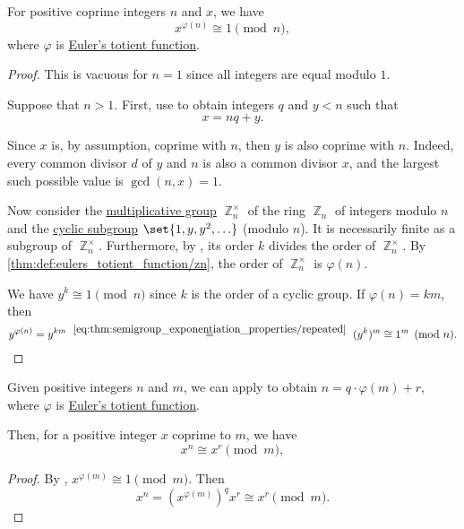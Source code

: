 \begin{theorem}\label{thm:eulers_totient_theorem}
  For positive coprime integers \( n \) and \( x \), we have
  \begin{equation*}
    x^{\varphi(n)} \cong 1 \pmod n,
  \end{equation*}
  where \( \varphi \) is \hyperref[def:eulers_totient_function]{Euler's totient function}.
\end{theorem}
\begin{proof}
  This is vacuous for \( n = 1 \) since all integers are equal modulo \( 1 \).

  Suppose that \( n > 1 \). First, use  to obtain integers \( q \) and \( y < n \) such that
  \begin{equation*}
    x = nq + y.
  \end{equation*}

  Since \( x \) is, by assumption, coprime with \( n \), then \( y \) is also coprime with \( n \). Indeed, every common divisor \( d \) of \( y \) and \( n \) is also a common divisor \( x \), and the largest such possible value is \( \gcd(n, x) = 1 \).

  Now consider the \hyperref[def:semiring]{multiplicative group} \( \BbbZ_n^\times \) of the ring \hyperref[def:ring_of_integers_modulo]{\( \BbbZ_n \)} of integers modulo \( n \) and the \hyperref[def:cyclic_group]{cyclic subgroup} \( \set{ 1, y, y^2, \ldots } \) (modulo \( n \)). It is necessarily finite as a subgroup of \( \BbbZ_n^\times \). Furthermore, by , its order \( k \) divides the order of \( \BbbZ_n^\times \). By \cref{thm:def:eulers_totient_function/zn}, the order of \( \BbbZ_n^\times \) is \( \varphi(n) \).

  We have \( y^k \cong 1 \pmod n \) since \( k \) is the order of a cyclic group. If \( \varphi(n) = km \), then
  \begin{equation*}
    y^{\varphi(n)}
    =
    y^{km}
    \reloset {\eqref{eq:thm:semigroup_exponentiation_properties/repeated}} =
    (y^k)^m
    \cong
    1^m
    \pmod n.
  \end{equation*}
\end{proof}

\begin{corollary}\label{thm:division_modulo}
  Given positive integers \( n \) and \( m \), we can apply  to obtain \( n = q \cdot \varphi(m) + r \), where \( \varphi \) is \hyperref[def:eulers_totient_function]{Euler's totient function}.

  Then, for a positive integer \( x \) coprime to \( m \), we have
  \begin{equation*}
    x^n \cong x^r \pmod m,
  \end{equation*}
\end{corollary}
\begin{proof}
  By , \( x^{\varphi(m)} \cong 1 \pmod m \). Then
  \begin{equation*}
    x^n = (x^{\varphi(m)})^q x^r \cong x^r \pmod m.
  \end{equation*}
\end{proof}

